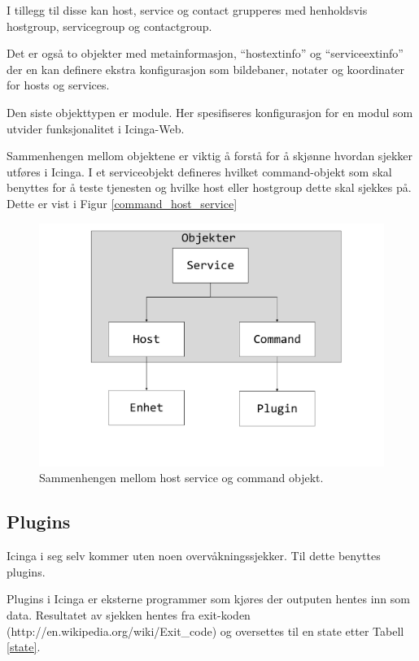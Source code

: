 I tillegg til disse kan host, service og contact grupperes med henholdsvis hostgroup, servicegroup og contactgroup.

Det er også to objekter med metainformasjon, “hostextinfo” og “serviceextinfo” der en kan definere ekstra konfigurasjon som bildebaner, notater og koordinater for hosts og services.

Den siste objekttypen er module. Her spesifiseres konfigurasjon for en modul som utvider funksjonalitet i Icinga-Web.

Sammenhengen mellom objektene er viktig å forstå for å skjønne hvordan sjekker utføres i Icinga. I et serviceobjekt defineres hvilket command-objekt som skal benyttes for å teste tjenesten og hvilke host eller hostgroup dette skal sjekkes på. Dette er vist i Figur \ref{command_host_service}

\begin{center}
\begin{figure}
    \includegraphics{img/command_host_service}
    \caption{Sammenhengen mellom host service og command objekt.}
    \label{losninger}
\end{figure}
\end{center}

\subsection{Plugins}
Icinga i seg selv kommer uten noen overvåkningssjekker. Til dette benyttes plugins.

Plugins i Icinga er eksterne programmer som kjøres der outputen hentes inn som data. Resultatet av sjekken hentes fra exit-koden (http://en.wikipedia.org/wiki/Exit\_code) og oversettes til en state etter Tabell \ref{state}.



